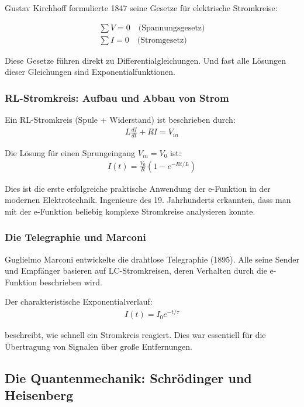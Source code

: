 \documentclass[a4paper, 12pt, twoside, openright]{report}
\theoremstyle{definition}
\theoremstyle{definition}
\begin{document}
Gustav Kirchhoff formulierte 1847 seine Gesetze für elektrische Stromkreise:

\begin{align}
	\sum V = 0 \quad \text{(Spannungsgesetz)}\\
	\sum I = 0 \quad \text{(Stromgesetz)}
\end{align}

Diese Gesetze führen direkt zu Differentialgleichungen. Und fast alle Lösungen dieser Gleichungen sind Exponentialfunktionen.

\subsubsection*{RL-Stromkreis: Aufbau und Abbau von Strom}

Ein RL-Stromkreis (Spule + Widerstand) ist beschrieben durch:
\begin{align}
	L \frac{dI}{dt} + R I = V_{in}
\end{align}

Die Lösung für einen Sprungeingang $V_{in} = V_0$ ist:
\begin{align}
	I(t) = \frac{V_0}{R} (1 - e^{-Rt/L})
\end{align}

Dies ist die erste erfolgreiche praktische Anwendung der e-Funktion in der modernen Elektrotechnik. Ingenieure des 19. Jahrhunderts erkannten, dass man mit der e-Funktion beliebig komplexe Stromkreise analysieren konnte.

\subsubsection*{Die Telegraphie und Marconi}

Guglielmo Marconi entwickelte die drahtlose Telegraphie (1895). Alle seine Sender und Empfänger basieren auf LC-Stromkreisen, deren Verhalten durch die e-Funktion beschrieben wird.

Der charakteristische Exponentialverlauf:
\begin{align}
	I(t) = I_0 e^{-t/\tau}
\end{align}

beschreibt, wie schnell ein Stromkreis reagiert. Dies war essentiell für die Übertragung von Signalen über große Entfernungen.

\subsection{Die Quantenmechanik: Schrödinger und Heisenberg}
\end{document}
